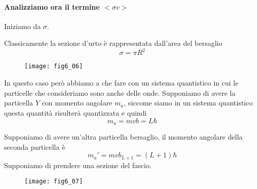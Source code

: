 \paragraph{Analizziamo ora il termine $<\sigma v>$} Iniziamo da $\sigma$.

Classicamente la sezione d'urto è rappresentata dall'area del bersaglio
\begin{equation}
\sigma=\pi R^2
\end{equation}
\begin{figure}[h]
\centering
\texttt{[image: fig6\_06]}
\end{figure}

In questo caso però abbiamo a che fare con un sistema quantistico in cui le particelle che consideriamo sono anche delle onde.
Supponiamo di avere la particella $Y$ con momento angolare $m_a$, siccome siamo in un sistema quantistico questa quantità risulterà quantizzata e quindi
\begin{equation}
m_a=mvb=L\hbar
\end{equation}

Supponiamo di avere un'altra particella bersaglio, il momento angolare della seconda particella è
\begin{equation}
m_a'=mvb_{L+1}=(L+1)\hbar
\end{equation}
Supponiamo di prendere una sezione del fascio.
\begin{figure}[h]
\centering
\texttt{[image: fig6\_07]}
\end{figure}

